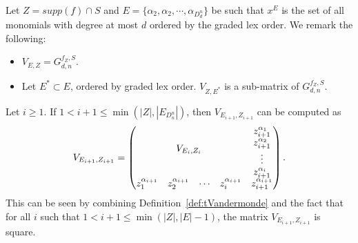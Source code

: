 \documentclass[11pt]{llncs}
\begin{document}
\begin{remark}\label{rem:subsetOfReedMuller}
Let $Z = supp(f)\cap S$ and $E = \{\alpha_2, \alpha_2, \cdots, \alpha_{D_d^n}\}$ be such that $x^E$ is the set of all monomials with degree at most $d$ ordered by the graded lex order. 
    We remark the following:
    \begin{itemize}
        \item $V_{E,Z} = G_{d,n}^{f_{Z},S}$.
        \item Let $E^{*}\subset E$, ordered by graded lex order. $V_{Z,E^{*}}$ is a sub-matrix of $G_{d,n}^{f_Z, S}$.
    \end{itemize}
\end{remark}

\begin{remark}\label{rem:squareConstruction}
 Let $i\geq 1$. If $1< i+1 \leq \min{\left(|Z|, |E_{D_n^n}|\right)}$, then $V_{E_{i+1},Z_{i+1}}$ can be computed as
    \begin{align*}
        V_{E_{i+1}, Z_{i+1}} = 
        \begin{pmatrix}
        \multicolumn{4}{c}{\multirow{4}{*}{$V_{E_{i}, Z_{i}}$}} & z_{i+1}^{\alpha_{1}}\\
        & & & & z_{i+1}^{\alpha_{2}}\\
        & & & & \vdots\\
        & & & & z_{i+1}^{\alpha_{i}}\\
        z_1^{\alpha_{i+1}} & z_2^{\alpha_{i+1}}& \cdots & z_{i}^{\alpha_{i+1}} & z_{i+1}^{\alpha_{i+1}}
    \end{pmatrix}.
    \end{align*}
    This can be seen by combining Definition~\ref{def:tVandermonde} and the fact that for all $i$ such that $1< i+1 \leq \min{\left(|Z|, |E|-1\right)}$, the matrix $V_{E_{i+1}, Z_{i+1}}$ is square.
\end{remark}
\end{document}
